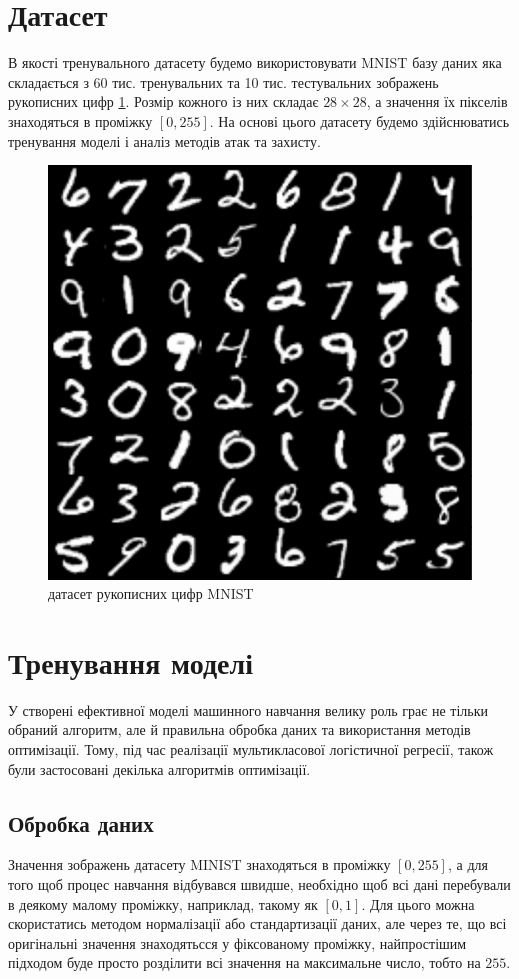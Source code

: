 \documentclass[a4paper,14pt]{extreport}
\begin{document}
	\section{Датасет}
	В якості тренувального датасету будемо використовувати MNIST базу даних яка складається з 60 тис. тренувальних та 10 тис. тестувальних зображень рукописних цифр \ref{fig:minist_dataset}. Розмір кожного із них складає $28 \times 28$, а значення їх пікселів знаходяться в проміжку $[0, 255]$. На основі цього датасету будемо здійснюватись тренування моделі і аналіз методів атак та захисту.
	\begin{figure}[h]
		\centering
		\includegraphics[width=0.4 \textwidth]{resources/minist_dataset.pdf}
		\caption{датасет рукописних цифр MNIST}
		\label{fig:minist_dataset}
	\end{figure}

	
	\section{Тренування моделі}
	\label{sec:model}
	У створені ефективної моделі машинного навчання велику роль грає не тільки обраний алгоритм, але й правильна обробка даних та використання методів оптимізації. Тому, під час реалізації мультикласової логістичної регресії, також були застосовані декілька алгоритмів оптимізації.
	
	\subsection{Обробка даних}
	Значення зображень датасету MINIST знаходяться в проміжку $[0, 255]$, а для того щоб процес навчання відбувався швидше, необхідно щоб всі дані перебували в деякому малому проміжку, наприклад, такому як $[0, 1]$. Для цього можна скористатись методом нормалізації або стандартизації даних, але через те, що всі оригінальні значення знаходятьсся у фіксованому проміжку, найпростішим підходом буде просто розділити всі значення на максимальне число, тобто на $255$.
\end{document}
